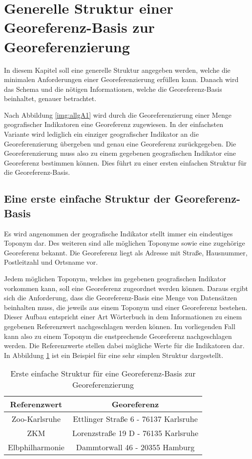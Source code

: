 	\section{Generelle Struktur einer Georeferenz-Basis zur Georeferenzierung} \label{sec:generelleStruktur} 

		In diesem Kapitel soll eine generelle Struktur angegeben werden, welche die minimalen Anforderungen einer Georeferenzierung erfüllen kann.
		Danach wird das Schema und die nötigen Informationen, welche die Georeferenz-Basis beinhaltet, genauer betrachtet.
		
		Nach Abbildung \ref{img:allgA1} wird durch die Georeferenzierung einer Menge geografischer Indikatoren eine Georeferenz zugewiesen.
		In der einfachsten Variante wird lediglich ein einziger geografischer Indikator an die Georeferenzierung übergeben und genau eine Georeferenz zurückgegeben.
		Die Georeferenzierung muss also zu einem gegebenen geografischen Indikator eine Georeferenz bestimmen können.
		Dies führt zu einer ersten einfachen Struktur für die Georeferenz-Basis.	

		\subsection*{Eine erste einfache Struktur der Georeferenz-Basis} 

			Es wird angenommen der geografische Indikator stellt immer ein eindeutiges Toponym dar.
			Des weiteren sind alle möglichen Toponyme sowie eine zugehörige Georeferenz bekannt. 
			Die Georeferenz liegt als Adresse mit Straße, Hausnummer, Postleitzahl und Ortsname vor.

			Jedem möglichen Toponym, welches im gegebenen geografischen Indikator vorkommen kann, soll eine Georeferenz zugeordnet werden können. 
			Daraus ergibt sich die Anforderung, dass die Georeferenz-Basis eine Menge von Datensätzen beinhalten muss, die jeweils aus einem Toponym und einer Georeferenz bestehen.
			Dieser Aufbau entspricht einer Art Wörterbuch in dem Informationen zu einem gegebenen Referenzwert nachgeschlagen werden können.
			Im vorliegenden Fall kann also zu einem Toponym die enstprechende Georeferenz nachgeschlagen werden.
			Die Referenzwerte stellen dabei mögliche Werte für die Indikatoren dar. 
			In Abbildung \ref{tab:simpleStruktur} ist ein Beispiel für eine sehr simplen Struktur dargestellt.

			\begin{table}[htpb]
					\caption{Erste einfache Struktur für eine Georeferenz-Basis zur Georeferenzierung} 
					\centering
					\begin{tabular}{|c|c|}
						\hline
						Referenzwert & Georeferenz \\
						\hline\hline
						Zoo-Karlsruhe & Ettlinger Straße 6 - 76137 Karlsruhe \\
						\hline
						ZKM & Lorenzstraße 19 D - 76135 Karlsruhe \\
						\hline
						Elbphilharmonie & Dammtorwall 46 - 20355 Hamburg \\
						\hline
					\end{tabular}
					\label{tab:simpleStruktur} 
			\end{table} 

